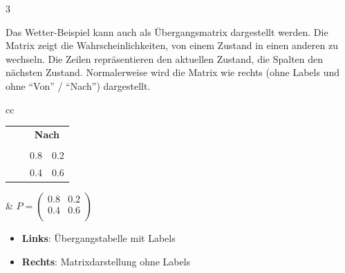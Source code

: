 \begin{landscape}
\begin{multicols*}{3}
\begin{cheatSheetBox}[title=Gerichteter Graph]
    \end{cheatSheetBox}

    \begin{cheatSheetBox}[title=Übergangsmatrix]
      Das Wetter-Beispiel kann auch als Übergangsmatrix dargestellt werden. Die Matrix zeigt die Wahrscheinlichkeiten, von einem Zustand in einen anderen zu wechseln. Die Zeilen repräsentieren den aktuellen Zustand, die Spalten den nächsten Zustand. Normalerweise wird die Matrix wie rechts (ohne Labels und ohne \enquote{Von} / \enquote{Nach}) dargestellt.
      \begin{center}
        \begin{tabular}{cc}
          \begin{tabular}{c c|c|c}
                                                          &                  & \multicolumn{2}{c}{\textbf{Nach}}                    \\
                                                          &                  & \emoji{sun}                       & \emoji{umbrella} \\\midrule\midrule
            \multirow{2}{*}{\rotatebox{90}{\textbf{Von}}} & \emoji{sun}      & 0.8                               & 0.2              \\\cmidrule{2-4}
                                                          & \emoji{umbrella} & 0.4                               & 0.6              \\
          \end{tabular}
           &
          \(
          P = \begin{pmatrix}
                0.8 & 0.2 \\
                0.4 & 0.6 \\
              \end{pmatrix}
          \)
        \end{tabular}
      \end{center}
      \begin{itemize}[leftmargin=*,labelsep=0.5em]
        \item \textbf{Links}: Übergangstabelle mit Labels
        \item \textbf{Rechts}: Matrixdarstellung ohne Labels
      \end{itemize}
    \end{cheatSheetBox}
    

\end{multicols*}
\end{landscape}
